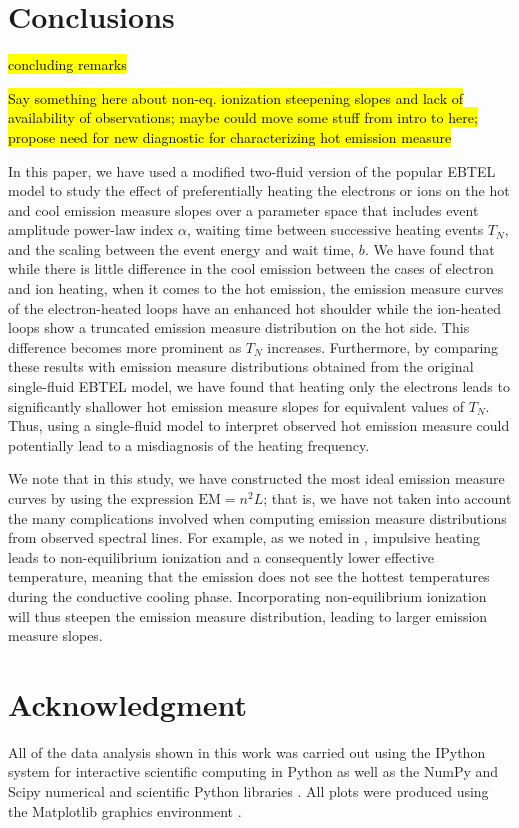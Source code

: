 \documentclass[tighten,apj]{emulateapj}
\begin{document}
	\section{Conclusions}
	\label{sec:conclusions}
	\par\hl{concluding remarks}
	\par\hl{Say something here about non-eq. ionization steepening slopes and lack of availability of observations; maybe could move some stuff from intro to here; propose need for new diagnostic for characterizing hot emission measure}
	\par In this paper, we have used a modified two-fluid version of the popular EBTEL model to study the effect of preferentially heating the electrons or ions on the hot and cool emission measure slopes over a parameter space that includes event amplitude power-law index $\alpha$, waiting time between successive heating events $T_N$, and the scaling between the event energy and wait time, $b$. We have found that while there is little difference in the cool emission between the cases of electron and ion heating, when it comes to the hot emission, the emission measure curves of the electron-heated loops have an enhanced hot shoulder while the ion-heated loops show a truncated emission measure distribution on the hot side. This difference becomes more prominent as $T_N$ increases. Furthermore, by comparing these results with emission measure distributions obtained from the original single-fluid EBTEL model, we have found that heating only the electrons leads to significantly shallower hot emission measure slopes for equivalent values of $T_N$. Thus, using a single-fluid model to interpret observed hot emission measure could potentially lead to a misdiagnosis of the heating frequency.
	\par We note that in this study, we have constructed the most ideal emission measure curves by using the expression $\mathrm{EM}=n^2L$; that is, we have not taken into account the many complications involved when computing emission measure distributions from observed spectral lines. For example, as we noted in , impulsive heating leads to non-equilibrium ionization and a consequently lower effective temperature, meaning that the emission does not see the hottest temperatures during the conductive cooling phase. Incorporating non-equilibrium ionization will thus steepen the emission measure distribution, leading to larger emission measure slopes.
	\section*{Acknowledgment}
	All of the data analysis shown in this work was carried out using the IPython system for interactive scientific computing in Python as well as the NumPy and Scipy numerical and scientific Python libraries \citep{perez_ipython:_2007,van_der_walt_numpy_2011}. All plots were produced using the Matplotlib graphics environment \citep{hunter_matplotlib:_2007}.
	\appendix
\end{document}
